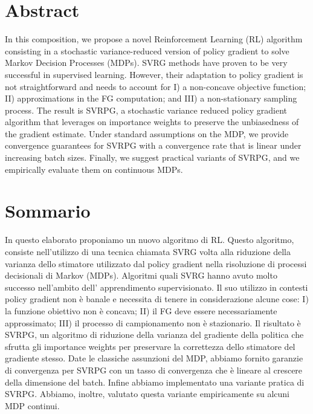 
\begingroup
\let\clearpage\relax
\let\cleardoublepage\relax
\let\cleardoublepage\relax

\chapter*{Abstract}
In this composition, we propose a novel Reinforcement Learning (\acs{RL}) algorithm consisting in a stochastic variance-reduced version of policy gradient to solve Markov Decision Processes (\acs{MDP}s).\newline
\ac{SVRG} methods have proven to be very successful in supervised learning. However, their adaptation to policy gradient is not straightforward and needs to account for I) a non-concave objective function; II) approximations in the \ac{FG} computation; and III) a non-stationary sampling process. The result is \ac{SVRPG}, a stochastic variance reduced policy gradient algorithm that leverages on importance weights to preserve the unbiasedness of the gradient estimate. Under standard assumptions on the \acs{MDP}, we provide convergence guarantees for \acs{SVRPG} with a convergence rate that is linear under increasing batch sizes. Finally, we suggest practical variants of \acs{SVRPG}, and we empirically evaluate them on continuous \acs{MDP}s.

\vfill
\newpage
{}
\chapter*{Sommario}
In questo elaborato proponiamo un nuovo algoritmo di \ac{RL}. Questo algoritmo, consiste  nell'utilizzo di una tecnica chiamata \ac{SVRG} volta alla riduzione della varianza dello stimatore  utilizzato dal policy gradient nella risoluzione di processi decisionali di Markov (\acs{MDP}s).\newline
Algoritmi quali \acs{SVRG} hanno avuto molto successo nell'ambito dell' apprendimento supervisionato. Il suo utilizzo in contesti policy gradient non \`e banale e necessita di tenere in considerazione alcune cose: I) la funzione obiettivo non è concava; II) il \ac{FG} deve essere necessariamente approssimato;  III) il processo di campionamento non \`e stazionario. Il risultato \`e \ac{SVRPG}, un algoritmo di riduzione della varianza del gradiente della politica che sfrutta gli importance weights per preservare la correttezza dello stimatore del gradiente stesso. Date le classiche assunzioni del \acs{MDP}, abbiamo fornito garanzie di convergenza per \acs{SVRPG} con un tasso di convergenza che \`e lineare al crescere della dimensione del batch. Infine abbiamo implementato una variante pratica di \acs{SVRPG}. Abbiamo, inoltre, valutato questa variante empiricamente  su alcuni \acs{MDP} continui.

\endgroup
